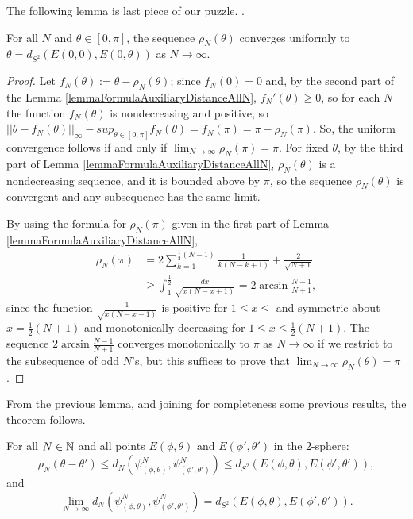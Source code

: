 The following lemma is last piece of our puzzle. \cite{DAndrea2013}.
\begin{lemma} For all $N$ and $\theta \in [0, \pi]$, the sequence $\rho_N(\theta)$ converges uniformly to $\theta = d_{S^2}(E(0, 0), E(0, \theta))$ as $N\to \infty$. 
\end{lemma}

\begin{proof}
 Let $f_N(\theta) := \theta - \rho_N(\theta)$; since $f_N(0) = 0$ and, by the second part of the Lemma \ref{lemmaFormulaAuxiliaryDistanceAllN}, $f_N'(\theta) \geq 0$, so for each $N$ the function $f_N(\theta)$ is nondecreasing and positive, so $|| \theta - f_N(\theta)||_\infty - sup_{\theta \in [0, \pi]} f_N(\theta) = f_N(\pi) = \pi - \rho_N(\pi)$. So, the uniform convergence follows if and only if $\lim_{N \to \infty} \rho_N(\pi) = \pi$. For fixed $\theta$, by the third part of Lemma \ref{lemmaFormulaAuxiliaryDistanceAllN}, $\rho_N(\theta)$ is a nondecreasing sequence, and it is bounded above by $\pi$, so the sequence $\rho_N(\theta)$ is convergent and any subsequence has the same limit.
 
 By using the formula for $\rho_N(\pi)$ given in the first part of Lemma \ref{lemmaFormulaAuxiliaryDistanceAllN}, 
 \begin{align*}
     \rho_N(\pi) &= 2 \sum_{k = 1}^{\frac{1}{2}(N-1)} \frac{1}{k (N - k + 1)} + \frac{2}{\sqrt{N+1}} \\
     &\geq \int_{1}^{\frac{1}{2}} \frac{dx}{\sqrt{x(N-x+1)}} = 2 \arcsin \frac{N-1}{N+1},
 \end{align*} since the function $\frac{1}{\sqrt{x(N-x+1)}}$ is positive for $1 \leq x \leq $ and symmetric about $x = \frac{1}{2}(N+1)$ and monotonically decreasing for $1 \leq x \leq \frac{1}{2}(N+1)$. The sequence $2 \arcsin \frac{N-1}{N+1}$ converges monotonically to $\pi$ as $N \to \infty$ if we restrict to the subsequence of odd $N$'s, but this suffices to prove that $\lim_{N \to \infty} \rho_N(\theta) = \pi$.
\end{proof}

From the previous lemma, and joining for completeness some previous results, the theorem follows.
\begin{theorem} \label{theoremdNWithRespectoTodS2}
For all $N \in \mathbb{N}$ and all points $E(\phi, \theta)$ and $E(\phi', \theta')$ in the $2$-sphere:
$$
    \rho_N(\theta - \theta') \leq d_N(\psi^N_{(\phi, \theta)}, \psi^N_{(\phi', \theta')}) \leq d_{S^2}(E(\phi, \theta), E(\phi', \theta')),
$$
and 
\begin{equation}
        \lim_{N \to \infty} d_N(\psi^N_{(\phi, \theta)}, \psi^N_{(\phi', \theta')}) = d_{S^2}(E(\phi, \theta), E(\phi', \theta')).
\end{equation}
\end{theorem}


